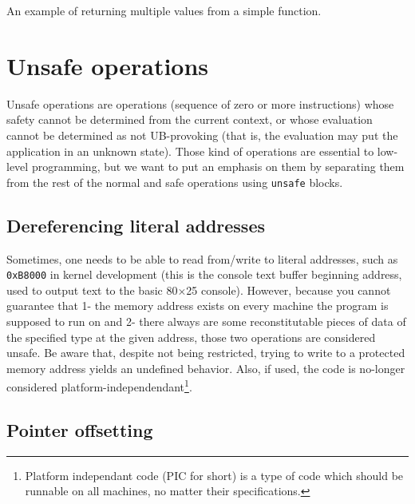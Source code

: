 \begin{listing}[htb]
	\centering
	\inputminted{\nstarlexer}{examples/return-multiple-values.nst}

	\caption{An example of returning multiple values from a simple function.}
	\label{lst:nstar-common-bs-returnvalues}
\end{listing}

\section{Unsafe operations}\label{sec:nstar-common-unsafe}

Unsafe operations are operations (sequence of zero or more instructions) whose safety cannot be determined from the current context, or whose evaluation cannot be determined as not UB-provoking (that is, the evaluation may put the application in an unknown state).
Those kind of operations are essential to low-level programming, but we want to put an emphasis on them by separating them from the rest of the normal and safe operations using \texttt{unsafe} blocks.

\subsection{Dereferencing literal addresses}\label{subsec:nstar-common-unsafe-derefliteraladdr}

Sometimes, one needs to be able to read from/write to literal addresses, such as \texttt{0xB8000} in kernel development (this is the console text buffer beginning address, used to output text to the basic 80×25 console).
However, because you cannot guarantee that 1- the memory address exists on every machine the program is supposed to run on and 2- there always are some reconstitutable pieces of data of the specified type at the given address, those two operations are considered unsafe.
Be aware that, despite not being restricted, trying to write to a protected memory address yields an undefined behavior.
Also, if used, the code is no-longer considered platform-independendant\footnote{Platform independant code (PIC for short) is a type of code which should be runnable on all machines, no matter their specifications.}.

\subsection{Pointer offsetting}\label{subsec:nstar-common-unsafe-ptroffset}


